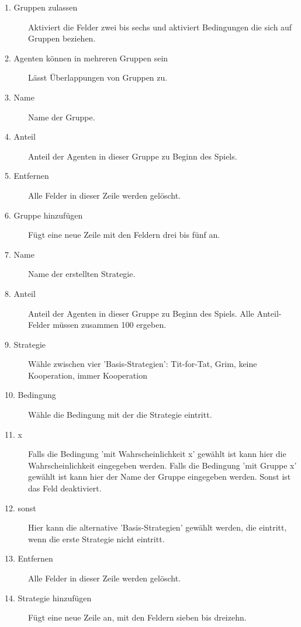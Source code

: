 \begin{description}

\item[1. Gruppen zulassen] Aktiviert die Felder zwei bis sechs und aktiviert Bedingungen die sich auf Gruppen beziehen.

\item[2. Agenten können in mehreren Gruppen sein] Lässt Überlappungen von Gruppen zu.

\item[3. Name] Name der Gruppe.

\item[4. Anteil] Anteil der Agenten in dieser Gruppe zu Beginn des Spiels.

\item[5. Entfernen] Alle Felder in dieser Zeile werden gelöscht.

\item[6. Gruppe hinzufügen] Fügt eine neue Zeile mit den Feldern drei bis fünf an.

\item[7. Name] Name der erstellten Strategie.

\item[8. Anteil] Anteil der Agenten in dieser Gruppe zu Beginn des Spiels. Alle Anteil-Felder müssen zusammen 100 ergeben.

\item[9. Strategie] Wähle zwischen vier 'Basis-Strategien': Tit-for-Tat, Grim, keine Kooperation, immer Kooperation

\item[10. Bedingung] Wähle die Bedingung mit der die Strategie eintritt. 

\item[11. x] Falls die Bedingung 'mit Wahrscheinlichkeit x' gewählt ist kann hier die Wahrscheinlichkeit eingegeben werden. Falls die Bedingung 'mit Gruppe x' gewählt ist kann hier der Name der Gruppe eingegeben werden. Sonst ist das Feld deaktiviert.

\item[12. sonst] Hier kann die alternative 'Basis-Strategien' gewählt werden, die eintritt, wenn die erste Strategie nicht eintritt.

\item[13. Entfernen] Alle Felder in dieser Zeile werden gelöscht.

\item[14. Strategie hinzufügen] Fügt eine neue Zeile an, mit den Feldern sieben bis dreizehn.


\end{description}
